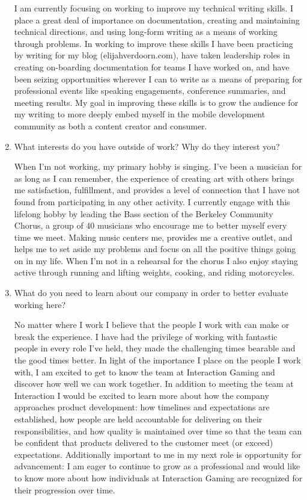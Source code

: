 \documentclass[9pt,letterpaper]{article}
\begin{document}
\begin{enumerate}
		I am currently focusing on working to improve my technical writing skills. I place a great deal of importance on documentation, creating and maintaining technical directions, and using long-form writing as a means of working through problems. In working to improve these skills I have been practicing by writing for my blog (elijahverdoorn.com), have taken leadership roles in creating on-boarding documentation for teams I have worked on, and have been seizing opportunities wherever I can to write as a means of preparing for professional events like speaking engagements, conference summaries, and meeting results. My goal in improving these skills is to grow the audience for my writing to more deeply embed myself in the mobile development community as both a content creator and consumer.

	\item What interests do you have outside of work? Why do they interest you?

		When I'm not working, my primary hobby is singing. I've been a musician for as long as I can remember, the experience of creating art with others brings me satisfaction, fulfillment, and provides a level of connection that I have not found from participating in any other activity. I currently engage with this lifelong hobby by leading the Bass section of the Berkeley Community Chorus, a group of 40 musicians who encourage me to better myself every time we meet. Making music centers me, provides me a creative outlet, and helps me to set aside my problems and focus on all the positive things going on in my life. When I'm not in a rehearsal for the chorus I also enjoy staying active through running and lifting weights, cooking, and riding motorcycles.

	\item What do you need to learn about our company in order to better evaluate working here?

		No matter where I work I believe that the people I work with can make or break the experience. I have had the privilege of working with fantastic people in every role I've held, they made the challenging times bearable and the good times better. In light of the importance I place on the people I work with, I am excited to get to know the team at Interaction Gaming and discover how well we can work together. In addition to meeting the team at Interaction I would be excited to learn more about how the company approaches product development: how timelines and expectations are established, how people are held accountable for delivering on their responsibilities, and how quality is maintained over time so that the team can be confident that products delivered to the customer meet (or exceed) expectations. Additionally important to me in my next role is opportunity for advancement: I am eager to continue to grow as a professional and would like to know more about how individuals at Interaction Gaming are recognized for their progression over time.
\end{enumerate}
\end{document}
